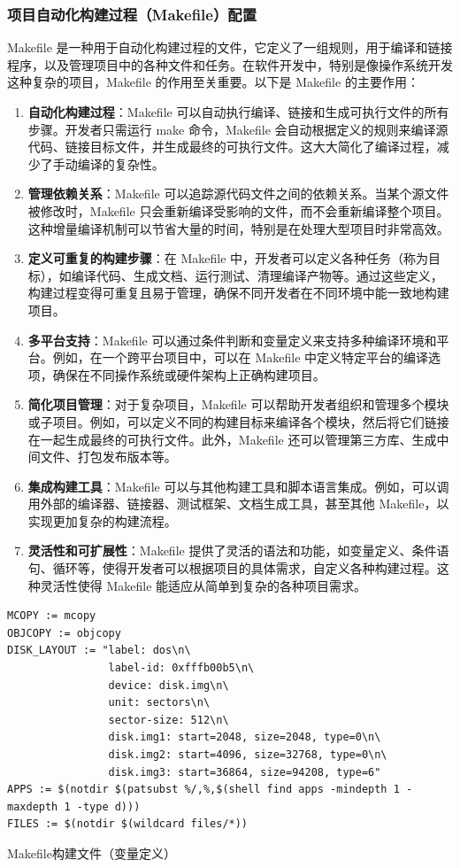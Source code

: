 \subsubsection{项目自动化构建过程（Makefile）配置}

Makefile 是一种用于自动化构建过程的文件，它定义了一组规则，用于编译和链接程序，以及管理项目中的各种文件和任务。在软件开发中，特别是像操作系统开发这种复杂的项目，Makefile 的作用至关重要。以下是 Makefile 的主要作用：

\begin{enumerate}
    \item \textbf{自动化构建过程}：Makefile 可以自动执行编译、链接和生成可执行文件的所有步骤。开发者只需运行 make 命令，Makefile 会自动根据定义的规则来编译源代码、链接目标文件，并生成最终的可执行文件。这大大简化了编译过程，减少了手动编译的复杂性。
    \item \textbf{管理依赖关系}：Makefile 可以追踪源代码文件之间的依赖关系。当某个源文件被修改时，Makefile 只会重新编译受影响的文件，而不会重新编译整个项目。这种增量编译机制可以节省大量的时间，特别是在处理大型项目时非常高效。
    \item \textbf{定义可重复的构建步骤}：在 Makefile 中，开发者可以定义各种任务（称为目标），如编译代码、生成文档、运行测试、清理编译产物等。通过这些定义，构建过程变得可重复且易于管理，确保不同开发者在不同环境中能一致地构建项目。
    \item \textbf{多平台支持}：Makefile 可以通过条件判断和变量定义来支持多种编译环境和平台。例如，在一个跨平台项目中，可以在 Makefile 中定义特定平台的编译选项，确保在不同操作系统或硬件架构上正确构建项目。
    \item \textbf{简化项目管理}：对于复杂项目，Makefile 可以帮助开发者组织和管理多个模块或子项目。例如，可以定义不同的构建目标来编译各个模块，然后将它们链接在一起生成最终的可执行文件。此外，Makefile 还可以管理第三方库、生成中间文件、打包发布版本等。
    \item \textbf{集成构建工具}：Makefile 可以与其他构建工具和脚本语言集成。例如，可以调用外部的编译器、链接器、测试框架、文档生成工具，甚至其他 Makefile，以实现更加复杂的构建流程。
    \item \textbf{灵活性和可扩展性}：Makefile 提供了灵活的语法和功能，如变量定义、条件语句、循环等，使得开发者可以根据项目的具体需求，自定义各种构建过程。这种灵活性使得 Makefile 能适应从简单到复杂的各种项目需求。
\end{enumerate}

\begin{listing}[htbp]
    \begin{verbatim}
MCOPY := mcopy
OBJCOPY := objcopy
DISK_LAYOUT := "label: dos\n\
                label-id: 0xfffb00b5\n\
                device: disk.img\n\
                unit: sectors\n\
                sector-size: 512\n\
                disk.img1: start=2048, size=2048, type=0\n\
                disk.img2: start=4096, size=32768, type=0\n\
                disk.img3: start=36864, size=94208, type=6"
APPS := $(notdir $(patsubst %/,%,$(shell find apps -mindepth 1 -maxdepth 1 -type d)))
FILES := $(notdir $(wildcard files/*))
    \end{verbatim}
    \caption{Makefile构建文件（变量定义）}\label{lst:MakefileVariable}
\end{listing}

